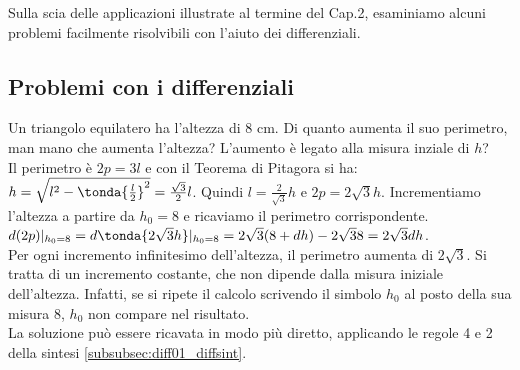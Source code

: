 Sulla scia delle applicazioni illustrate al termine del Cap.2, esaminiamo alcuni problemi 
facilmente risolvibili con l'aiuto dei differenziali.

\subsection{Problemi con i differenziali}
\label{subsec:diff01__problemi}

\begin{esempio}
Un triangolo equilatero ha l'altezza di $8$ cm. Di quanto aumenta il suo perimetro,
man mano che aumenta l'altezza? L'aumento è legato alla misura inziale di $h$?\\
Il perimetro è $2p=3l$ e con il Teorema di Pitagora si ha: 
$h=\sqrt{l^2-\tonda{\frac{l}{2}}^2}=\frac{\sqrt{3}}{2}l$. Quindi 
$l=\frac{2}{\sqrt{3}}h$
e $2p=2\sqrt{3}h$. 
Incrementiamo l'altezza a partire da $h_0=8$ e ricaviamo il perimetro corrispondente.\\
$d(2p)|_{h_0=8}=d\tonda{2\sqrt{3}h}|_{h_0=8}=2\sqrt{3}(8+dh)-2\sqrt{3}8=2\sqrt{3}dh$.\\
Per ogni incremento infinitesimo dell'altezza, il perimetro aumenta di $2\sqrt{3}$.
Si tratta di un incremento costante, che non dipende dalla misura iniziale
dell'altezza. Infatti, se si ripete il calcolo scrivendo il simbolo $h_0$ al posto della 
sua misura $8$, $h_0$ non compare nel risultato.\\
La soluzione può essere ricavata in modo più diretto, applicando le regole
4 e 2 della sintesi \ref{subsubsec:diff01_diffsint}.


\end{esempio}

